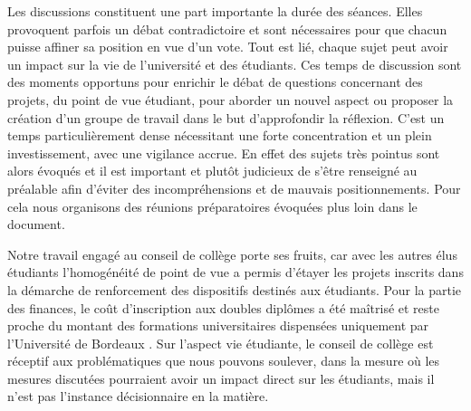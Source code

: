 \documentclass{article}
\begin{document}
Les discussions constituent une part importante la durée des séances. Elles provoquent parfois un débat contradictoire et sont nécessaires pour que chacun puisse affiner sa position en vue d'un vote. Tout est lié, chaque sujet peut avoir un impact sur la vie de l'université et des étudiants. Ces temps de discussion sont des moments opportuns pour enrichir le débat de questions concernant des projets, du point de vue étudiant, pour aborder un nouvel aspect ou proposer la création d’un groupe de travail dans le but d'approfondir la réflexion. C’est un temps particulièrement dense nécessitant une forte concentration et un plein investissement, avec une vigilance accrue. En effet des sujets très pointus sont alors évoqués et il est important et plutôt judicieux de s'être renseigné au préalable afin d’éviter des incompréhensions et de mauvais positionnements. Pour cela nous organisons des réunions préparatoires évoquées plus loin dans le document.

Notre travail engagé au conseil de collège porte ses fruits, car avec les autres élus étudiants l'homogénéité de point de vue a permis d’étayer les projets inscrits dans la démarche de renforcement des dispositifs destinés aux étudiants. Pour la partie des finances, le coût d'inscription aux doubles diplômes a été maîtrisé et reste proche du montant des formations universitaires dispensées uniquement par l'Université de Bordeaux . Sur l'aspect vie étudiante, le conseil de collège est réceptif aux problématiques que nous pouvons soulever, dans la mesure où les mesures discutées pourraient avoir un impact direct sur les étudiants, mais  il n'est pas l'instance décisionnaire en la matière.
\end{document}
